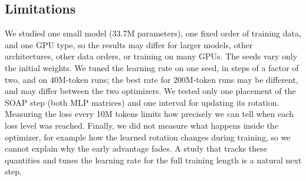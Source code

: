\subsection{Limitations}

We studied one small model (33.7M parameters), one fixed order of training
data, and one GPU type, so the results may differ for larger models, other
architectures, other data orders, or training on many GPUs. The seeds vary only
the initial weights. We tuned the learning rate on one seed, in steps of a
factor of two, and on 40M-token runs; the best rate for 200M-token runs may be
different, and may differ between the two optimizers. We tested only one
placement of the SOAP step (both MLP matrices) and one interval for updating its
rotation. Measuring the loss every 10M tokens limits how precisely we can tell
when each loss level was reached. Finally, we did not measure what happens
inside the optimizer, for example how the learned rotation changes during
training, so we cannot explain why the early advantage fades. A study that
tracks these quantities and tunes the learning rate for the full training
length is a natural next step.
